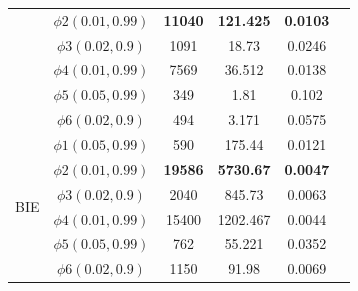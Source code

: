 \begin{table}
\begin{tabular}{c c c c c c}
                & $\phi2(0.01,0.99)$ &  \textbf{11040}&  \textbf{121.425} &  \textbf{0.0103}\\ 
                & $\phi3(0.02,0.9)$ &  1091& 18.73& 0.0246\\ 
                & $\phi4(0.01,0.99)$ &  7569&  36.512 &  0.0138\\ 
                & $\phi5(0.05,0.99)$ &  349&  1.81&  0.102\\ 
                & $\phi6(0.02,0.9)$ &  494& 3.171& 0.0575\\     
        \hline 
         \multirow{6}{1.5cm}{BIE}  
                & $\phi1(0.05,0.99)$ &  590&  175.44&  0.0121\\ 
                & $\phi2(0.01,0.99)$ &  \textbf{19586}&  \textbf{5730.67} &  \textbf{0.0047} \\ 
                & $\phi3(0.02,0.9)$ &  2040& 845.73& 0.0063\\ 
                & $\phi4(0.01,0.99)$ & 15400&  1202.467 &  0.0044\\ 
                & $\phi5(0.05,0.99)$ &  762&  55.221&  0.0352\\ 
                & $\phi6(0.02,0.9)$ &  1150& 91.98& 0.0069\\      
        \hline 
\end{tabular} 
\label{ta-rs}
\end{table}


